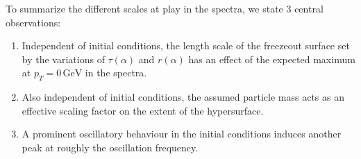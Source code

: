 To summarize the different scales at play in the spectra, we state 3 central observations:
\begin{enumerate}
    \item Independent of initial conditions, the length scale of the freezeout surface set by the variations of $\tau(\alpha)$ and $r(\alpha)$ has an effect of the expected maximum at ${p_T=0\,\text{GeV}}$ in the spectra.
    \item Also independent of initial conditions, the assumed particle mass acts as an effective scaling factor on the extent of the hypersurface.
    \item A prominent oscillatory behaviour in the initial conditions induces another peak at roughly the oscillation frequency.
\end{enumerate}